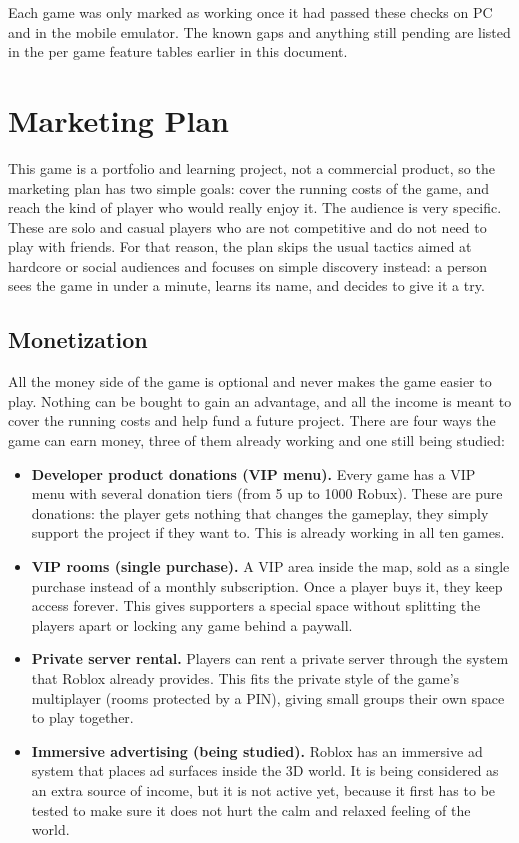 \documentclass[12pt,letterpaper]{article}
\begin{document}
Each game was only marked as working once it had passed these checks on PC and in the mobile emulator. The known gaps and anything still pending are listed in the per game feature tables earlier in this document.

\section{Marketing Plan}

This game is a portfolio and learning project, not a commercial product, so the marketing plan has two simple goals: cover the running costs of the game, and reach the kind of player who would really enjoy it. The audience is very specific. These are solo and casual players who are not competitive and do not need to play with friends. For that reason, the plan skips the usual tactics aimed at hardcore or social audiences and focuses on simple discovery instead: a person sees the game in under a minute, learns its name, and decides to give it a try.

\subsection{Monetization}

All the money side of the game is optional and never makes the game easier to play. Nothing can be bought to gain an advantage, and all the income is meant to cover the running costs and help fund a future project. There are four ways the game can earn money, three of them already working and one still being studied:

\begin{itemize}
  \item \textbf{Developer product donations (VIP menu).} Every game has a VIP menu with several donation tiers (from 5 up to 1000 Robux). These are pure donations: the player gets nothing that changes the gameplay, they simply support the project if they want to. This is already working in all ten games.
  \item \textbf{VIP rooms (single purchase).} A VIP area inside the map, sold as a single purchase instead of a monthly subscription. Once a player buys it, they keep access forever. This gives supporters a special space without splitting the players apart or locking any game behind a paywall.
  \item \textbf{Private server rental.} Players can rent a private server through the system that Roblox already provides. This fits the private style of the game's multiplayer (rooms protected by a PIN), giving small groups their own space to play together.
  \item \textbf{Immersive advertising (being studied).} Roblox has an immersive ad system that places ad surfaces inside the 3D world. It is being considered as an extra source of income, but it is not active yet, because it first has to be tested to make sure it does not hurt the calm and relaxed feeling of the world.
\end{itemize}
\end{document}
